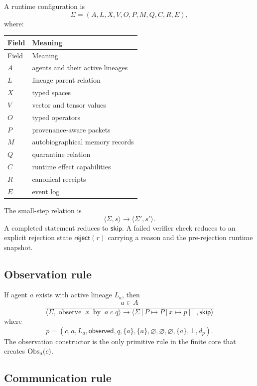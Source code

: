 A runtime configuration is
\[
\Sigma=
(A,L,X,V,O,P,M,Q,C,R,E),
\]
where:
\begin{longtable}{p{}p{}}
\toprule
Field & Meaning \\
\midrule
\endfirsthead
\toprule
Field & Meaning \\
\midrule
\endhead
\(A\) & agents and their active lineages \\
\(L\) & lineage parent relation \\
\(X\) & typed spaces \\
\(V\) & vector and tensor values \\
\(O\) & typed operators \\
\(P\) & provenance-aware packets \\
\(M\) & autobiographical memory records \\
\(Q\) & quarantine relation \\
\(C\) & runtime effect capabilities \\
\(R\) & canonical receipts \\
\(E\) & event log \\
\bottomrule
\end{longtable}
The small-step relation is
\[
\langle\Sigma,s\rangle
\longrightarrow
\langle\Sigma',s'\rangle.
\]
A completed statement reduces to \(\mathsf{skip}\).  A failed verifier check
reduces to an explicit rejection state
\(\mathsf{reject}(r)\) carrying a reason and the pre-rejection runtime snapshot.

\subsection{Observation rule}

If agent \(a\) exists with active lineage \(L_a\), then
\[
\frac{
  a\in A
}{
  \langle\Sigma,
  \operatorname{observe}\;x\;\operatorname{by}\;a\;c\;q
  \rangle
  \longrightarrow
  \langle
  \Sigma[P\mapsto P[x\mapsto p]],\mathsf{skip}
  \rangle
}
\]
where
\[
p=(c,a,L_a,\mathsf{observed},q,
\{a\},\{a\},\varnothing,\varnothing,\varnothing,\{a\},\bot,d_p).
\]
The observation constructor is the only primitive rule in the finite core that
creates \(\operatorname{Obs}_a(c)\).

\subsection{Communication rule}

